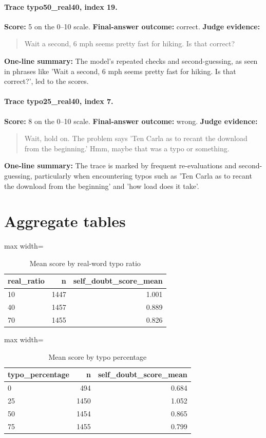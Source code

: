 \documentclass[11pt]{article}
\begin{document}
\paragraph{Trace typo50\_real40, index 19.}
\textbf{Score:} 5 on the 0--10 scale. \textbf{Final-answer outcome:} correct.
\textbf{Judge evidence:} \begin{quote}Wait a second, 6 mph seems pretty fast for hiking. Is that correct?\end{quote}
\textbf{One-line summary:} The model's repeated checks and second-guessing, as seen in phrases like 'Wait a second, 6 mph seems pretty fast for hiking. Is that correct?', led to the scores.\medskip
\paragraph{Trace typo25\_real40, index 7.}
\textbf{Score:} 8 on the 0--10 scale. \textbf{Final-answer outcome:} wrong.
\textbf{Judge evidence:} \begin{quote}Wait, hold on. The problem says 'Ten Carla as to recant the download from the beginning.' Hmm, maybe that was a typo or something.\end{quote}
\textbf{One-line summary:} The trace is marked by frequent re-evaluations and second-guessing, particularly when encountering typos such as 'Ten Carla as to recant the download from the beginning' and 'how load does it take'.\medskip

\section*{Aggregate tables}

\begin{table}[H]
\centering
\caption{Mean score by real-word typo ratio}
\small
\begin{adjustbox}{max width=\textwidth}
\begin{tabular}{lrr}
\toprule
\textbf{real\_ratio} & \textbf{n} & \textbf{self\_doubt\_score\_mean} \\
\midrule
10 & 1447 & 1.001 \\
40 & 1457 & 0.889 \\
70 & 1455 & 0.826 \\
\bottomrule
\end{tabular}
\end{adjustbox}
\end{table}

\begin{table}[H]
\centering
\caption{Mean score by typo percentage}
\small
\begin{adjustbox}{max width=\textwidth}
\begin{tabular}{lrr}
\toprule
\textbf{typo\_percentage} & \textbf{n} & \textbf{self\_doubt\_score\_mean} \\
\midrule
0 & 494 & 0.684 \\
25 & 1450 & 1.052 \\
50 & 1454 & 0.865 \\
75 & 1455 & 0.799 \\
\bottomrule
\end{tabular}
\end{adjustbox}
\end{table}
\end{document}
